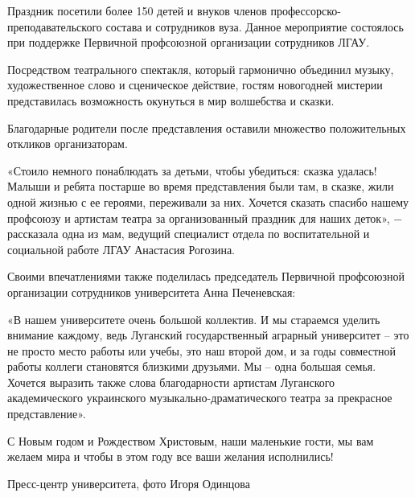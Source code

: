 Праздник посетили более 150 детей и внуков членов
профессорско-преподавательского состава и сотрудников вуза. Данное мероприятие
состоялось при поддержке Первичной профсоюзной организации сотрудников ЛГАУ.


Посредством театрального спектакля, который гармонично объединил музыку,
художественное слово и сценическое действие, гостям новогодней мистерии
представилась возможность окунуться в мир волшебства и сказки.

Благодарные родители после представления оставили множество положительных
откликов организаторам.

\begin{zznagolos}
«Стоило немного понаблюдать за детьми, чтобы убедиться: сказка удалась! Малыши
и ребята постарше во время представления были там, в сказке, жили одной жизнью
с ее героями, переживали за них. Хочется сказать спасибо нашему профсоюзу и
артистам театра за организованный праздник для наших деток», − рассказала одна
из мам, ведущий специалист отдела по воспитательной и социальной работе ЛГАУ
Анастасия Рогозина.	
\end{zznagolos}

Своими впечатлениями также поделилась председатель Первичной профсоюзной
организации сотрудников университета Анна Печеневская:

\begin{zznagolos}
«В нашем университете очень большой коллектив. И мы стараемся уделить внимание
каждому, ведь Луганский государственный аграрный университет  – это не просто
место работы или учебы, это наш второй дом, и за годы совместной работы коллеги
становятся близкими друзьями. Мы –  одна большая семья. Хочется выразить также
слова благодарности артистам Луганского академического украинского
музыкально-драматического театра за прекрасное представление».	
\end{zznagolos}

С Новым годом и Рождеством Христовым, наши маленькие гости, мы вам желаем мира
и чтобы в этом году все ваши желания исполнились!

Пресс-центр университета, фото Игоря Одинцова
